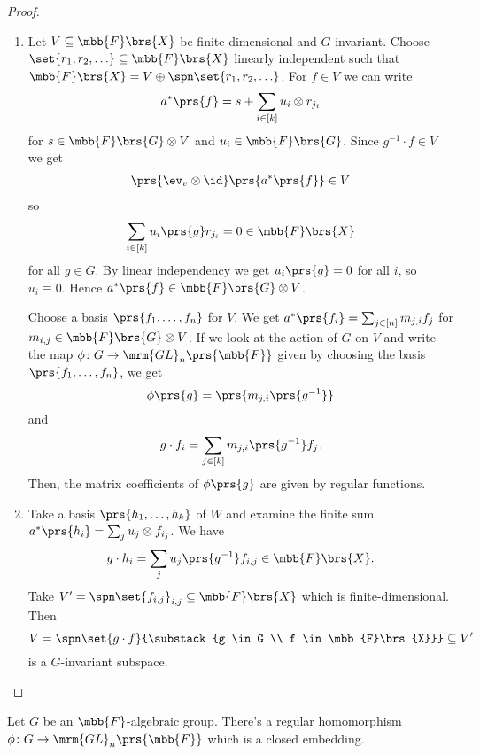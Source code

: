 \documentclass[10pt,a4paper,twoside,openany,hidelinks]{book}
\begin{document}
\begin{proof}
\begin{enumerate}
\item Let $V \subseteq \mbb{F}\brs{X}$ be finite-dimensional and $G$-invariant.
Choose $\set{r_1, r_2, \ldots} \subseteq \mbb{F}\brs{X}$ linearly independent such that $\mbb{F}\brs{X} = V \oplus \spn\set{r_1, r_2, \ldots}$.
For $f \in V$ we can write
\[a^*\prs{f} = s + \sum_{i \in [k]} u_i \otimes r_{j_i}\]
for $s \in \mbb{F}\brs{G} \otimes V$ and $u_i \in \mbb{F}\brs{G}$.
Since $g^{-1}\cdot f \in V$ we get
\begin{align*}
\prs{\ev_v \otimes \id} \prs{a^*\prs{f}} \in V
\end{align*}
so
\begin{align*}
\sum_{i \in [k]} u_i\prs{g} r_{j_i} = 0 \in \mbb{F}\brs{X}
\end{align*}
for all $g \in G$.
By linear independency we get $u_i\prs{g} = 0$ for all $i$, so $u_i \equiv 0$.
Hence $a^*\prs{f} \in \mbb{F}\brs{G} \otimes V$.

Choose a basis $\prs{f_1, \ldots, f_n}$ for $V$. We get $a^*\prs{f_i} = \sum_{j \in [n]} m_{j,i} f_j$ for $m_{i,j} \in \mbb{F}\brs{G} \otimes V$.
If we look at the action of $G$ on $V$ and write the map $\phi \colon G \to \mrm{GL}_n\prs{\mbb{F}}$ given by choosing the basis $\prs{f_1, \ldots, f_n}$, we get
\[\phi\prs{g} = \prs{m_{j,i} \prs{g^{-1}}}\]
and
\[g \cdot f_i = \sum_{j \in [k]} m_{j,i} \prs{g^{-1}} f_j \text{.}\]
Then, the matrix coefficients of $\phi\prs{g}$ are given by regular functions.

\item Take a basis $\prs{h_1, \ldots, h_k}$ of $W$ and examine the finite sum
$a^*\prs{h_i} = \sum_j u_j \otimes f_{i_j}$.
We have
\[g \cdot h_i = \sum_j u_j\prs{g^{-1}} f_{i,j} \in \mbb{F}\brs{X} \text{.}\]
Take $V' = \spn\set{f_{i,j}}_{i,j} \subseteq \mbb{F}\brs{X}$ which is finite-dimensional.
Then
\[V = \spn\set{g \cdot f}{\substack{g \in G \\ f \in \mbb{F}\brs{X}}} \subseteq V'\]
is a $G$-invariant subspace.
\end{enumerate}
\end{proof}

\begin{proposition}
Let $G$ be an $\mbb{F}$-algebraic group. There's a regular homomorphism $\phi \colon G \to \mrm{GL}_n\prs{\mbb{F}}$ which is a closed embedding.
\end{proposition}
\end{document}
